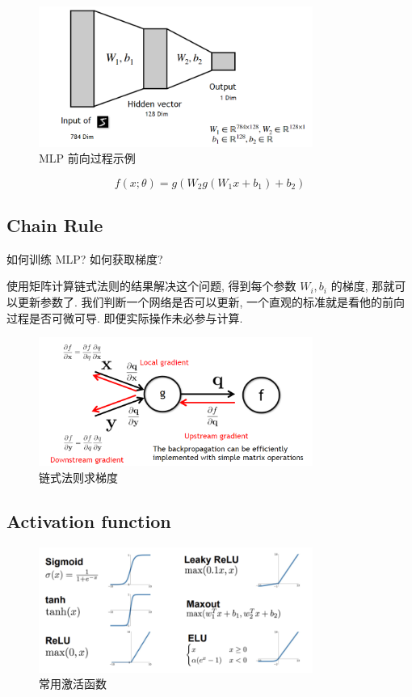 \documentclass[lang=cn,10pt,green]{elegantbook}
\begin{document}
\begin{figure}[htbp]
    \centering
    \includegraphics[width=0.8\textwidth]{figures/mlp.png}
    \caption{MLP 前向过程示例}
    \label{fig:mlp}
\end{figure}
$$ f(x; \theta) = g(W_2 g(W_1 x + b_1) + b_2) $$


\subsection{Chain Rule}
\begin{problem}
    如何训练 MLP? 如何获取梯度?
\end{problem}
使用矩阵计算链式法则的结果解决这个问题, 得到每个参数 $W_i, b_i$ 的梯度, 那就可以更新参数了. 我们判断一个网络是否可以更新, 一个直观的标准就是看他的前向过程是否可微可导. 即便实际操作未必参与计算. 
\begin{figure}[htbp]
    \centering
    \includegraphics[width=0.8\textwidth]{figures/chainrule.png}
    \caption{链式法则求梯度}
    \label{fig:chainrule}
\end{figure}

\subsection{Activation function}

\begin{figure}[htbp]
    \centering
    \includegraphics[width=0.8\textwidth]{figures/activationfunc.png}
    \caption{常用激活函数}
    \label{fig:chainrule}
\end{figure}
\end{document}
